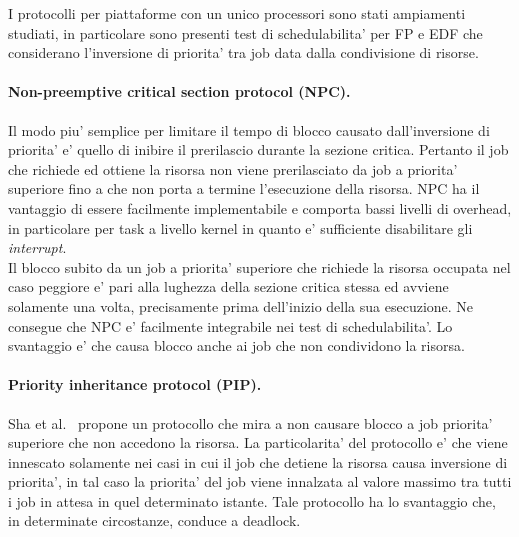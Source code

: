 I protocolli per piattaforme con un unico processori sono stati ampiamenti studiati, in particolare sono presenti test di schedulabilita' per FP e EDF che considerano l'inversione di priorita' tra job data dalla condivisione di risorse.\\

\paragraph{Non-preemptive critical section protocol (NPC).} Il modo piu' semplice per limitare il tempo di blocco causato dall'inversione di priorita' e' quello di inibire il prerilascio durante la sezione critica. Pertanto il job che richiede ed ottiene la risorsa non viene prerilasciato da job a priorita' superiore fino a che non porta a termine l'esecuzione della risorsa. NPC ha il vantaggio di essere facilmente implementabile e comporta bassi livelli di overhead, in particolare per task a livello kernel in quanto e' sufficiente disabilitare gli \textit{interrupt}.\\
Il blocco subito da un job a priorita' superiore che richiede la risorsa occupata nel caso peggiore e' pari alla lughezza della sezione critica stessa ed avviene solamente una volta, precisamente prima dell'inizio della sua esecuzione. Ne consegue che NPC e' facilmente integrabile nei test di schedulabilita'. Lo svantaggio e' che causa blocco anche ai job che non condividono la risorsa.\\

\paragraph{Priority inheritance protocol (PIP).} Sha et al.~\cite{Sha:1990:PIP:102822.626613} propone un protocollo che mira a non causare blocco a job priorita' superiore che non accedono la risorsa. La particolarita' del protocollo e' che viene innescato solamente nei casi in cui il job che detiene la risorsa causa inversione di priorita', in tal caso la priorita' del job viene innalzata al valore massimo tra tutti i job in attesa in quel determinato istante. Tale protocollo ha lo svantaggio che, in determinate circostanze, conduce a deadlock.\\

